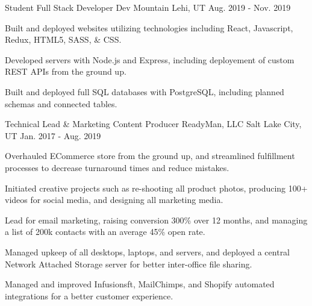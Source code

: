 

\begin{cventries}

  \cventry
    {Student Full Stack Developer} %
    {Dev Mountain} %
    {Lehi, UT} %
    {Aug. 2019 - Nov. 2019} %
    {
      \begin{cvitems} %
        \item {Built and deployed websites utilizing technologies including React, Javascript, Redux, HTML5, SASS, \& CSS.}
        \item {Developed servers with Node.js and Express, including deployement of custom REST APIs from the ground up.}
        \item {Built and deployed full SQL databases with PostgreSQL, including planned schemas and connected tables.}
      \end{cvitems}
    }

  \cventry
    {Technical Lead \& Marketing Content Producer} %
    {ReadyMan, LLC} %
    {Salt Lake City, UT} %
    {Jan. 2017 - Aug. 2019} %
    {
      \begin{cvitems} %
        \item {Overhauled ECommerce store from the ground up, and streamlined fulfillment processes to decrease turnaround times and reduce mistakes.}
        \item {Initiated creative projects such as re-shooting all product photos, producing 100+ videos for social media, and designing all marketing media.}
        \item {Lead for email marketing, raising conversion 300\% over 12 months, and managing a list of 200k contacts with an average 45\% open rate.}
        \item {Managed upkeep of all desktops, laptops, and servers, and deployed a central Network Attached Storage server for better inter-office file sharing.}
        \item {Managed and improved Infusionsft, MailChimps, and Shopify automated integrations for a better customer experience.}
      \end{cvitems}
    }


\end{cventries}
